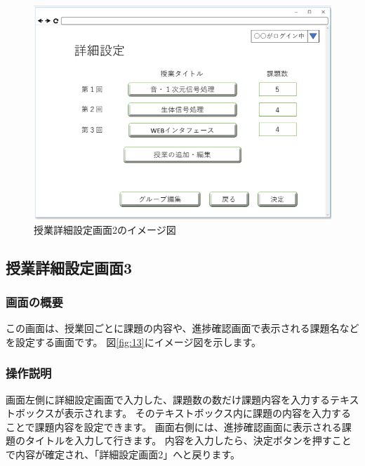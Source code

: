 \begin{figure}[htbp]
  \begin{center}
    \includegraphics[width=1\linewidth,clip]{./img/12.png}
    \caption{授業詳細設定画面2のイメージ図}\label{fig:12}
  \end{center}
\end{figure}

\newpage

\subsection{授業詳細設定画面3}
\subsubsection{画面の概要}
この画面は、授業回ごとに課題の内容や、進捗確認画面で表示される課題名などを設定する画面です。
図\ref{fig:13}にイメージ図を示します。

\subsubsection{操作説明}
画面左側に詳細設定画面で入力した、課題数の数だけ課題内容を入力するテキストボックスが表示されます。
そのテキストボックス内に課題の内容を入力することで課題内容を設定できます。
画面右側には、進捗確認画面に表示される課題のタイトルを入力して行きます。
内容を入力したら、決定ボタンを押すことで内容が確定され、「詳細設定画面2」へと戻ります。


